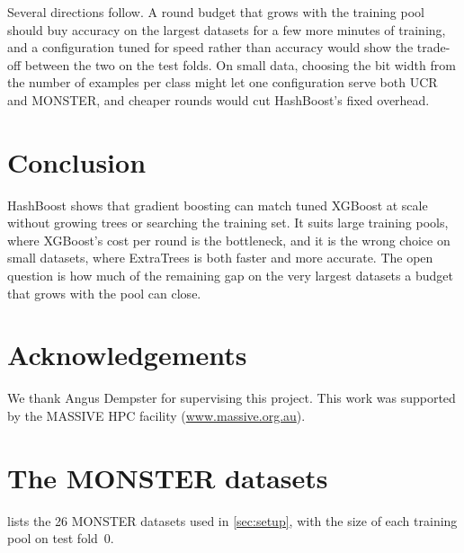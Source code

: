 \documentclass[a4paper, 11pt]{article}
\begin{document}
Several directions follow. A round budget that grows with the training pool
should buy accuracy on the largest datasets for a few more minutes of
training, and a configuration tuned for speed rather than accuracy would
show the trade-off between the two on the test folds. On small data,
choosing the bit width from the number of examples per class might let one
configuration serve both UCR and MONSTER, and cheaper rounds would cut
HashBoost's fixed overhead.

\section{Conclusion}

HashBoost shows that gradient boosting can match tuned XGBoost at scale
without growing trees or searching the training set. It suits large
training pools, where XGBoost's cost per round is the bottleneck, and it is
the wrong choice on small datasets, where ExtraTrees is both faster and more
accurate. The open question is how much of the remaining gap on the very
largest datasets a budget that grows with the pool can close.

\section*{Acknowledgements}

We thank Angus Dempster for supervising this project. This work was
supported by the MASSIVE HPC facility (\url{www.massive.org.au}).





\clearpage
\appendix
\section{The MONSTER datasets}
\label{app:datasets}

 lists the 26 MONSTER datasets used in
\cref{sec:setup}, with the size of each training pool on test fold~0.
\end{document}
